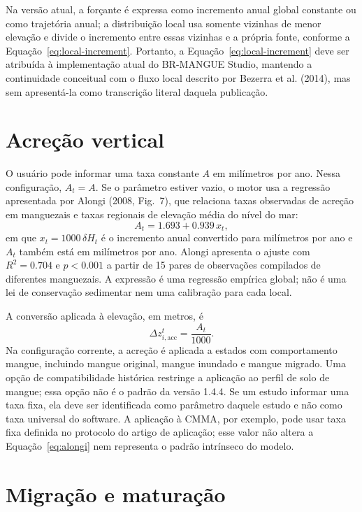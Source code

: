 \documentclass[11pt,a4paper]{article}
\begin{document}
Na versão atual, a forçante é expressa como incremento anual global constante ou como trajetória anual; a distribuição local usa somente vizinhas de menor elevação e divide o incremento entre essas vizinhas e a própria fonte, conforme a Equação~\ref{eq:local-increment}. Portanto, a Equação~\ref{eq:local-increment} deve ser atribuída à implementação atual do BR-MANGUE Studio, mantendo a continuidade conceitual com o fluxo local descrito por Bezerra et al. (2014), mas sem apresentá-la como transcrição literal daquela publicação.

\section{Acreção vertical}

O usuário pode informar uma taxa constante $A$ em milímetros por ano. Nessa configuração, $A_t=A$. Se o parâmetro estiver vazio, o motor usa a regressão apresentada por Alongi (2008, Fig.~7), que relaciona taxas observadas de acreção em manguezais e taxas regionais de elevação média do nível do mar:
\begin{equation}
A_t=1.693+0.939\,x_t,
\label{eq:alongi}
\end{equation}
em que $x_t=1000\,\delta H_t$ é o incremento anual convertido para milímetros por ano e $A_t$ também está em milímetros por ano. Alongi apresenta o ajuste com $R^2=0.704$ e $p<0.001$ a partir de 15 pares de observações compilados de diferentes manguezais. A expressão é uma regressão empírica global; não é uma lei de conservação sedimentar nem uma calibração para cada local.

A conversão aplicada à elevação, em metros, é
\begin{equation}
\Delta z_{i,\mathrm{acc}}^t=\frac{A_t}{1000}.
\label{eq:accretion-conversion}
\end{equation}
Na configuração corrente, a acreção é aplicada a estados com comportamento mangue, incluindo mangue original, mangue inundado e mangue migrado. Uma opção de compatibilidade histórica restringe a aplicação ao perfil de solo de mangue; essa opção não é o padrão da versão 1.4.4. Se um estudo informar uma taxa fixa, ela deve ser identificada como parâmetro daquele estudo e não como taxa universal do software. A aplicação à CMMA, por exemplo, pode usar taxa fixa definida no protocolo do artigo de aplicação; esse valor não altera a Equação~\ref{eq:alongi} nem representa o padrão intrínseco do modelo.

\section{Migração e maturação}
\end{document}
